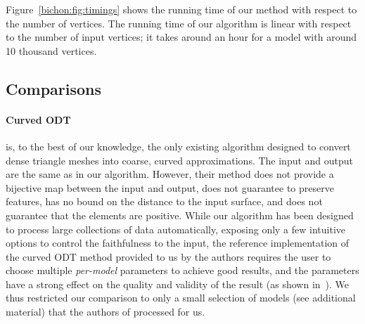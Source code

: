 Figure~\ref{bichon:fig:timings} shows the running time of our method with respect to the number of vertices. The running time of our algorithm is linear with respect to the number of input vertices; it takes around an hour for a model with around 10 thousand vertices.


\subsection{Comparisons}\label{cumin:sec:comparison}



\paragraph{Curved ODT}
\cite{feng2018curved} is, to the best of our knowledge, the only existing algorithm designed to convert dense triangle meshes into coarse, curved approximations. The input and output are the same as in our algorithm. However, their method does not provide a bijective map between the input and output, does not guarantee to preserve features, has no bound on the distance to the input surface, and does not guarantee that the elements are positive. While our algorithm has been designed to process large collections of data automatically, exposing only a few intuitive options to control the faithfulness to the input, the reference implementation of the curved ODT method provided to us by the authors requires the user to choose multiple \emph{per-model} parameters to achieve good results, and the parameters have a strong effect on the quality and validity of the result (as shown in~\cite[Figure 16]{feng2018curved}). We thus restricted our comparison to only a small selection of models (see additional material) that the authors of \cite{feng2018curved} processed for us.
%
